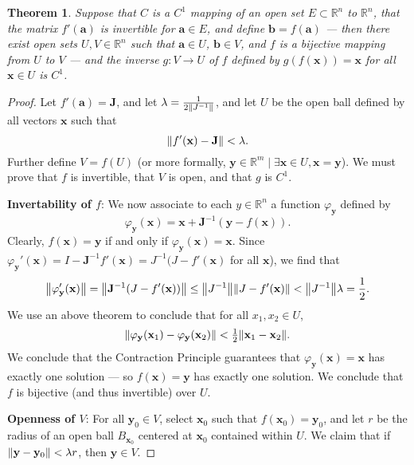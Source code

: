 \documentclass[11pt]{article}
\renewcommand{\vec}[1]{\mathbf{#1}}
\newcommand{\mat}[1]{\mathbf{#1}}
\newtheorem*{theorem*}{Theorem}
\begin{document}
\begin{theorem*}
	Suppose that $C$ is a $C^{1}$ mapping of an open set $E \subset \mathbb{R}^{n}$ to $\mathbb{R}^{n}$, that the matrix $f'(\vec{a})$ is invertible for $\vec{a} \in E$, and define $\vec{b} = f(\vec{a})$ --- then there exist open sets $U, V \in \mathbb{R}^{n}$ such that $\vec{a} \in U$, $\vec{b} \in V$, and $f$ is a bijective mapping from $U$ to $V$ --- and the inverse $g: V \to U$ of $f$ defined by $g(f(\vec{x})) = \vec{x}$ for all $\vec{x} \in U$ is $C^{1}$.
\end{theorem*}
\begin{adjustwidth}{0.5cm}{}
    \begin{proof}\renewcommand{\qedsymbol}{}
		Let $f'(\vec{a}) = \mat{J}$, and let $\lambda = \tfrac{1}{2 \norm{J^{-1}}}$, and let $U$ be the open ball defined by all vectors $\vec{x}$ such that
		\[
			\norm{f'(\vec{x}) - \mat{J}} < \lambda.
		\]
		Further define $V = f(U)$ (or more formally, $\vec{y} \in \mathbb{R}^{m} \mid \exists \vec{x} \in U, \vec{x} = \vec{y}$). We must prove that $f$ is invertible, that $V$ is open, and that $g$ is $C^{1}$.

		\textbf{Invertability of $f$}: We now associate to each $y \in \mathbb{R}^{n}$ a function $\varphi_{\vec{y}}$ defined by
		\[
			\varphi_{\vec{y}}(\vec{x}) = \vec{x} + \mat{J}^{-1} (\vec{y} - f(\vec{x})).
		\]
		Clearly, $f(\vec{x}) = \vec{y}$ if and only if $\varphi_{\vec{y}}(\vec{x}) = \vec{x}$. Since $\varphi_{\vec{y}}'(\vec{x}) = I - \mat{J}^{-1} f'(\vec{x}) = J^{-1}(J - f'(\vec{x})$ for all $\vec{x}$), we find that
		\[
			\norm{\varphi_{\vec{y}}'(\vec{x})} = \norm{\mat{J}^{-1}(J - f'(\vec{x}))} \le \norm{J^{-1}} \norm{J - f'(\vec{x})} < \norm{J^{-1}} \lambda = \frac{1}{2}.
		\]
		We use an above theorem to conclude that for all $x_{1}, x_{2} \in U$,
		\[
			\norm{\varphi_{\vec{y}}(\vec{x}_{1}) - \varphi_{\vec{y}}(\vec{x}_{2})} < \tfrac{1}{2} \norm{\vec{x}_{1} - \vec{x}_{2}}.
		\]
		We conclude that the Contraction Principle guarantees that $\varphi_{\vec{y}}(\vec{x}) = \vec{x}$ has exactly one solution --- so $f(\vec{x}) = \vec{y}$ has exactly one solution. We conclude that $f$ is bijective (and thus invertible) over $U$.

		\textbf{Openness of $V$}: For all $\vec{y}_{0} \in V$, select $\vec{x}_{0}$ such that $f(\vec{x}_{0}) = \vec{y}_{0}$, and let $r$ be the radius of an open ball $B_{\vec{x}_{0}}$ centered at $\vec{x}_{0}$ contained within $U$. We claim that if $\norm{\vec{y} - \vec{y}_{0}} < \lambda r$, then $\vec{y} \in V$. 


\end{proof}
\end{adjustwidth}
\end{document}
